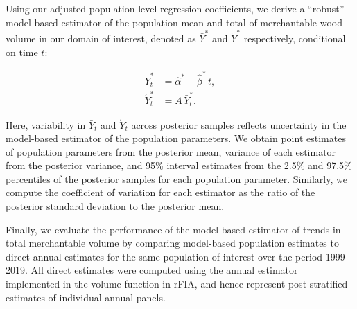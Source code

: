 \documentclass[11pt]{article}
\begin{document}
Using our adjusted population-level regression coefficients, we derive a ``robust'' model-based estimator \citep{little2004model} of the population mean and total of merchantable wood volume in our domain of interest, denoted as $\bar{Y}^{*}$ and $\acute{Y}^{*}$ respectively, conditional on time $t$:
\begin{linenomath*}
\begin{align}
    \bar{Y}_{t}^{*} &= \hat{\alpha}^{*} + \hat{\beta}^{*} \, t, \label{model2:mean} \\
    \acute{Y}_{t}^{*} &= A \, \bar{Y}_{t}^{*}. \label{model2:total}
\end{align}
\end{linenomath*}
Here, variability in $\bar{Y}_t$ and $\acute{Y}_t$ across posterior samples reflects uncertainty in the model-based estimator of the population parameters. We obtain point estimates of population parameters from the posterior mean,  variance of each estimator from the posterior variance, and 95\% interval estimates from the 2.5\% and 97.5\% percentiles of the posterior samples for each population parameter. Similarly, we compute the coefficient of variation for each estimator as the ratio of the posterior standard deviation to the posterior mean. 

Finally, we evaluate the performance of the model-based estimator of trends in total merchantable volume by comparing model-based population estimates to direct annual estimates for the same population of interest over the period 1999-2019. All direct estimates were computed using the annual estimator implemented in the volume function in rFIA, and hence represent post-stratified estimates of individual annual panels. 
\end{document}
